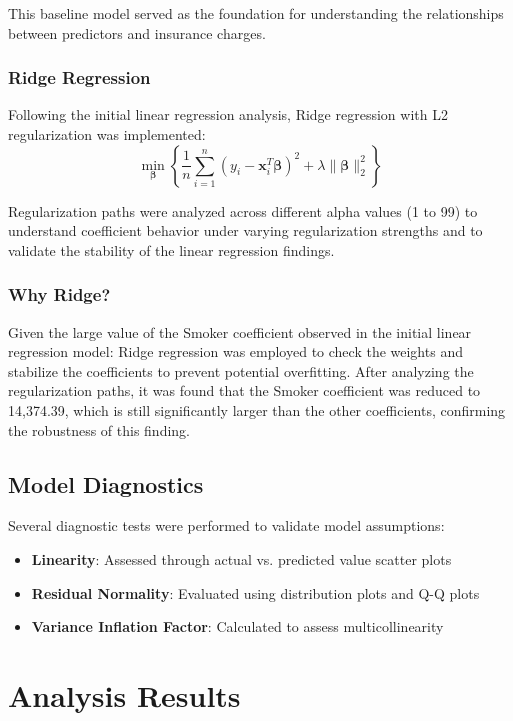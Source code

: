 \documentclass[12pt,a4paper]{article}
\begin{document}
This baseline model served as the foundation for understanding the relationships between predictors and insurance charges.

\subsubsection{Ridge Regression}  
Following the initial linear regression analysis, Ridge regression with L2 regularization was implemented:
$$\min_{\boldsymbol{\beta}} \left\{ \frac{1}{n}\sum_{i=1}^{n}(y_i - \mathbf{x}_i^T\boldsymbol{\beta})^2 + \lambda\|\boldsymbol{\beta}\|_2^2 \right\}$$

Regularization paths were analyzed across different alpha values (1 to 99) to understand coefficient behavior under varying regularization strengths and to validate the stability of the linear regression findings.

\subsubsection{Why Ridge?}
Given the large value of the Smoker coefficient observed in the initial linear regression model:
Ridge regression was employed to check the weights and stabilize the coefficients to prevent potential overfitting. After analyzing the regularization paths, it was found that the Smoker coefficient was reduced to 14,374.39, which is still significantly larger than the other coefficients, confirming the robustness of this finding.

\subsection{Model Diagnostics}

Several diagnostic tests were performed to validate model assumptions:
\begin{itemize}
    \item \textbf{Linearity}: Assessed through actual vs. predicted value scatter plots
    \item \textbf{Residual Normality}: Evaluated using distribution plots and Q-Q plots
    \item \textbf{Variance Inflation Factor}: Calculated to assess multicollinearity
\end{itemize}

\section{Analysis Results}
\end{document}
